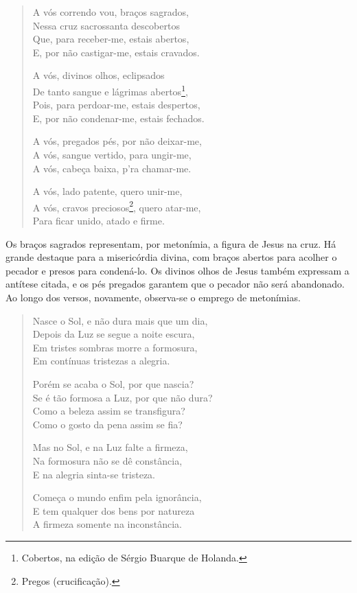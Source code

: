 \begin{verse}
A vós correndo vou, braços sagrados, \\
Nessa cruz sacrossanta descobertos \\
Que, para receber-me, estais abertos, \\
E, por não castigar-me, estais cravados.

A vós, divinos olhos, eclipsados \\
De tanto sangue e lágrimas abertos\footnote{Cobertos, na edição de Sérgio Buarque de Holanda.}, \\
Pois, para perdoar-me, estais despertos, \\
E, por não condenar-me, estais fechados.
				
A vós, pregados pés, por não deixar-me, \\
A vós, sangue vertido, para ungir-me, \\
A vós, cabeça baixa, p'ra chamar-me.
				
A vós, lado patente, quero unir-me, \\
A vós, cravos preciosos\footnote{Pregos (crucificação).}, quero atar-me, \\
Para ficar unido, atado e firme. \\
\end{verse}

Os braços sagrados representam, por metonímia, a figura de Jesus na cruz. Há grande destaque para a misericórdia divina, com braços abertos para acolher o pecador e presos para condená-lo. Os divinos olhos de Jesus também expressam a antítese citada, e os pés pregados garantem que o pecador não será abandonado. Ao longo dos versos, novamente, observa-se o emprego de metonímias.

\begin{verse}
Nasce o Sol, e não dura mais que um dia, \\
Depois da Luz se segue a noite escura, \\
Em tristes sombras morre a formosura, \\
Em contínuas tristezas a alegria.
				
Porém se acaba o Sol, por que nascia? \\
Se é tão formosa a Luz, por que não dura? \\
Como a beleza assim se transfigura? \\
Como o gosto da pena assim se fia?
				
Mas no Sol, e na Luz falte a firmeza, \\
Na formosura não se dê constância, \\
E na alegria sinta-se tristeza.
				
Começa o mundo enfim pela ignorância, \\
E tem qualquer dos bens por natureza \\
A firmeza somente na inconstância. \\
\end{verse}

